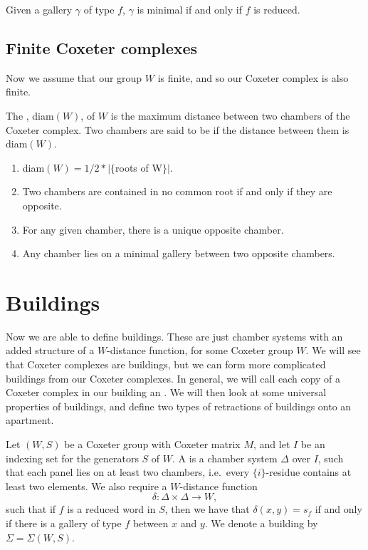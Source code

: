 \documentclass[11pt]{article}
\begin{document}
\begin{theorem}
    Given a gallery $\gamma$ of type $f$, $\gamma$ is minimal if and only if $f$ is reduced.
\end{theorem}


\subsection{Finite Coxeter complexes}

Now we assume that our group $W$ is finite, and so our Coxeter complex is also finite.

\begin{definition}
    The , diam$(W)$, of $W$ is the maximum distance between two chambers of the Coxeter complex. Two chambers are said to be  if the distance between them is diam$(W)$.
\end{definition}

\begin{theorem}
    \begin{enumerate}
        \item diam$(W) = 1/2\ast |\{${roots of W}$\}|$. 
        \item Two chambers are contained in no common root if and only if they are opposite.
        \item For any given chamber, there is a unique opposite chamber.
        \item Any chamber lies on a minimal gallery between two opposite chambers.
    \end{enumerate}
\end{theorem}


\section{Buildings}

Now we are able to define buildings. These are just chamber systems with an added structure of a $W$-distance function, for some Coxeter group $W$. We will see that Coxeter complexes are buildings, but we can form more complicated buildings from our Coxeter complexes. In general, we will call each copy of a Coxeter complex in our building an . We will then look at some universal properties of buildings, and define two types of retractions of buildings onto an apartment. 

\begin{definition}
    Let $(W,S)$ be a Coxeter group with Coxeter matrix $M$, and let $I$ be an indexing set for the generators $S$ of $W$. A  is a chamber system $\Delta$ over $I$, such that each panel lies on at least two chambers, i.e.\ every $\{i\}$-residue contains at least two elements. We also require a $W$-distance function
    \[\delta:\Delta\times \Delta \to W,\]
    such that if $f$ is a reduced word in $S$, then we have that $\delta(x,y)=s_f$ if and only if there is a gallery of type $f$ between $x$ and $y$. We denote a building by $\Sigma=\Sigma(W,S)$. 
\end{definition}
\end{document}
